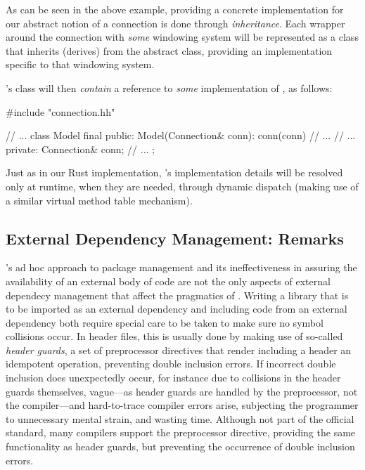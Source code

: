 As can be seen in the above example, providing a concrete implementation for
our abstract notion of a connection is done through \textit{inheritance}.
Each wrapper around the connection with \textit{some} windowing system will
be represented as a class that inherits (derives) from the 
abstract class, providing an implementation specific to that windowing system.

\wmcpp's  class will then \textit{contain} a reference to
\textit{some} implementation of , as follows:

\begin{cppblock}
  #include "connection.hh"
\end{cppblock}
\begin{cppblock}
  // ...
  class Model final
  {
  public:
    Model(Connection& conn): conn(conn) {
      // ...
    }
    // ...
  private:
    Connection& conn;
    // ...
  };
\end{cppblock}

Just as in our Rust implementation, 's implementation details will
be resolved only at runtime, when they are needed, through dynamic dispatch
(making use of a similar virtual method table mechanism).


\subsection{External Dependency Management: Remarks}

\cpp's ad hoc approach to package management and its ineffectiveness in assuring
the availability of an external body of code are not the only aspects of
external dependecy management that affect the pragmatics of \cpp. Writing a
library that is to be imported as an external dependency and including code
from an external dependency both require special care to be taken to make sure
no symbol collisions occur. In header files, this is usually done by making
use of so-called \textit{header guards}, a set of preprocessor directives that
render including a header an idempotent operation, preventing double inclusion
errors. If incorrect double inclusion does unexpectedly occur, for instance
due to collisions in the header guards themselves, vague---as header guards
are handled by the preprocessor, not the compiler---and hard-to-trace compiler
errors arise, subjecting the programmer to unnecessary mental strain, and
wasting time. Although not part of the official standard\cite{cppstd}, many \cpp
compilers support the  preprocessor directive, providing the
same functionality as header guards, but preventing the occurrence of double
inclusion errors.

